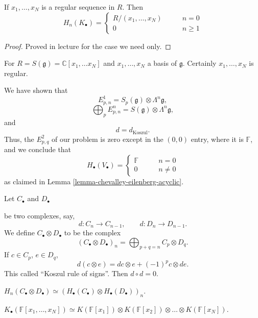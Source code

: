 \begin{theorem}
\label{theorem-koszul-homology}
If $x_1,\dots,x_N$ is a regular sequence
in $R$. Then
$$
H_n(K_\bullet)
=
\begin{cases}
R/(x_1,\dots,x_N)\qquad &n=0 \\
0\qquad &n \geq 1
\end{cases}
$$
\end{theorem}

\begin{proof}
Proved in lecture for the case we need only.
\end{proof}

\noindent
For $R = S(\mathfrak{g}) =
\mathbb{C}[x_1,\dots x_N]$
and $x_1,\dots,x_N$ a basis of
$\mathfrak{g}$. Certainly $x_1,\dots,x_N$
is regular.

We have shown that
$$
E^1_{p,n}
=
S_p(\mathfrak{g}) \otimes
\Lambda^n\mathfrak{g},
$$
$$
\bigoplus_p E^n_{p,n}
=
S(\mathfrak{g}) \otimes
\Lambda^n\mathfrak{g},
$$
and 
$$
d = d_{\operatorname{Koszul}}.
$$
Thus, the $E^2_{p,q}$ of our problem is
zero except in the $(0,0)$ entry, where it
is $\mathbb{F}$, and we conclude that
$$
H_\bullet(V_\bullet)
=
\begin{cases}
\mathbb{F}\qquad &n=0 \\
0\qquad &n\neq 0
\end{cases}
$$
as claimed in
Lemma
\ref{lemma-chevalley-eilenberg-acyclic}.

\medskip\noindent
Let $C_\bullet$ and $D_\bullet$

be two complexes, say,
$$
d:C_n \to C_{n-1},
\qquad 
d:D_n \to D_{n-1}.
$$
We define $C_\bullet \otimes D_\bullet$
to be the complex
$$
(C_\bullet \otimes D_\bullet)_n
=
\bigoplus_{p+q=n}
C_p \otimes D_q.
$$
If $c \in C_p$, $e \in D_q$,
$$
d(c \otimes e)
=
d c \otimes e +
(-1)^p c \otimes de.
$$
This called ``Koszul rule of signs''.
Then $d \circ d=0$.

\begin{proposition}
\label{proposition-homology-tensor-koszul}
$H_n(C_\bullet \otimes D_\bullet)
\simeq
(H_\bullet(C_\bullet)
\otimes H_\bullet(D_\bullet))_n$.
\end{proposition}

\begin{proposition}
\label{proposition-koszul-polynomials}
$K_\bullet(\mathbb{F}[x_1,\dots,x_N])
\simeq
K(\mathbb{F}[x_1]) \otimes
K(\mathbb{F}[x_2]) \otimes\dots
\otimes K(\mathbb{F}[x_N])$.
\end{proposition}

